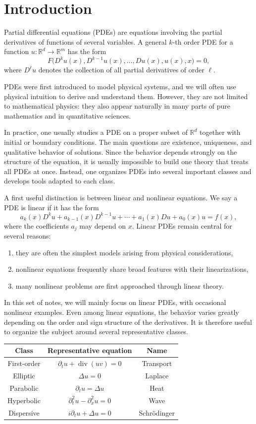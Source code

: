 \section{Introduction}

Partial differential equations (PDEs) are equations involving the partial derivatives of functions of several variables. A general $k$-th order PDE for a function $u:\mathbb{R}^d\to \mathbb{R}^m$ has the form
\[
F\bigl(D^k u(x),D^{k-1}u(x),\dots,Du(x),u(x),x\bigr)=0,
\]
where $D^\ell u$ denotes the collection of all partial derivatives of order $\ell$.

PDEs were first introduced to model physical systems, and we will often use physical intuition to derive and understand them. However, they are not limited to mathematical physics: they also appear naturally in many parts of pure mathematics and in quantitative sciences.

In practice, one usually studies a PDE on a proper subset of $\mathbb{R}^d$ together with initial or boundary conditions. The main questions are existence, uniqueness, and qualitative behavior of solutions. Since the behavior depends strongly on the structure of the equation, it is usually impossible to build one theory that treats all PDEs at once. Instead, one organizes PDEs into several important classes and develops tools adapted to each class.

A first useful distinction is between linear and nonlinear equations. We say a PDE is linear if it has the form
\[
a_k(x)D^k u + a_{k-1}(x)D^{k-1}u + \cdots + a_1(x)Du + a_0(x)u = f(x),
\]
where the coefficients $a_j$ may depend on $x$. Linear PDEs remain central for several reasons:
\begin{enumerate}
    \item they are often the simplest models arising from physical considerations,
    \item nonlinear equations frequently share broad features with their linearizations,
    \item many nonlinear problems are first approached through linear theory.
\end{enumerate}

In this set of notes, we will mainly focus on linear PDEs, with occasional nonlinear examples. Even among linear equations, the behavior varies greatly depending on the order and sign structure of the derivatives. It is therefore useful to organize the subject around several representative classes.

\begin{table}[H]
\centering
\begin{tabular}{c|c|c}
Class & Representative equation & Name \\
\hline
First-order & $\partial_t u + \operatorname{div}(uv)=0$ & Transport \\
Elliptic & $\Delta u = 0$ & Laplace \\
Parabolic & $\partial_t u = \Delta u$ & Heat \\
Hyperbolic & $\partial_t^2 u - \partial_x^2 u = 0$ & Wave \\
Dispersive & $i\partial_t u + \Delta u = 0$ & Schr\"odinger
\end{tabular}
\end{table}

